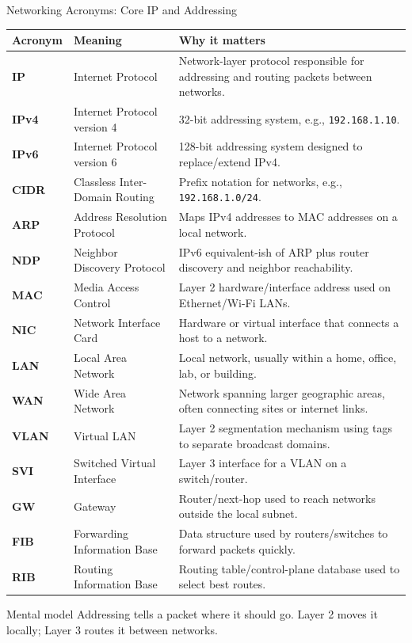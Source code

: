 \documentclass[aspectratio=169]{beamer}
\begin{document}
\begin{frame}{Networking Acronyms: Core IP and Addressing}
\tiny

\begin{tabular}{p{1.8cm} p{3.7cm} p{6.7cm}}
\toprule
\textbf{Acronym} & \textbf{Meaning} & \textbf{Why it matters} \\
\midrule
\textbf{IP} & Internet Protocol & Network-layer protocol responsible for addressing and routing packets between networks. \\
\textbf{IPv4} & Internet Protocol version 4 & 32-bit addressing system, e.g., \texttt{192.168.1.10}. \\
\textbf{IPv6} & Internet Protocol version 6 & 128-bit addressing system designed to replace/extend IPv4. \\
\textbf{CIDR} & Classless Inter-Domain Routing & Prefix notation for networks, e.g., \texttt{192.168.1.0/24}. \\
\textbf{ARP} & Address Resolution Protocol & Maps IPv4 addresses to MAC addresses on a local network. \\
\textbf{NDP} & Neighbor Discovery Protocol & IPv6 equivalent-ish of ARP plus router discovery and neighbor reachability. \\
\textbf{MAC} & Media Access Control & Layer 2 hardware/interface address used on Ethernet/Wi-Fi LANs. \\
\textbf{NIC} & Network Interface Card & Hardware or virtual interface that connects a host to a network. \\
\textbf{LAN} & Local Area Network & Local network, usually within a home, office, lab, or building. \\
\textbf{WAN} & Wide Area Network & Network spanning larger geographic areas, often connecting sites or internet links. \\
\textbf{VLAN} & Virtual LAN & Layer 2 segmentation mechanism using tags to separate broadcast domains. \\
\textbf{SVI} & Switched Virtual Interface & Layer 3 interface for a VLAN on a switch/router. \\
\textbf{GW} & Gateway & Router/next-hop used to reach networks outside the local subnet. \\
\textbf{FIB} & Forwarding Information Base & Data structure used by routers/switches to forward packets quickly. \\
\textbf{RIB} & Routing Information Base & Routing table/control-plane database used to select best routes. \\
\bottomrule
\end{tabular}

\vspace{0.12cm}

\begin{block}{Mental model}
Addressing tells a packet where it should go. Layer 2 moves it locally; Layer 3 routes it between networks.
\end{block}

\end{frame}
\end{document}
